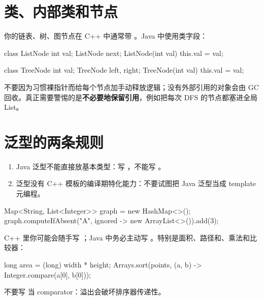 \section{类、内部类和节点}

你的链表、树、图节点在 C++ 中通常带 。Java 中使用类字段：

\begin{javacode}
class ListNode {
    int val;
    ListNode next;
    ListNode(int val) { this.val = val; }
}

class TreeNode {
    int val;
    TreeNode left, right;
    TreeNode(int val) { this.val = val; }
}
\end{javacode}

不要因为习惯裸指针而给每个节点加手动释放逻辑；没有外部引用的对象会由 GC 回收。真正需要警惕的是\textbf{不必要地保留引用}，例如把每次 DFS 的节点都塞进全局 List。

\section{泛型的两条规则}

\begin{enumerate}
  \item Java 泛型不能直接放基本类型：写 ，不能写 。
  \item 泛型没有 C++ 模板的编译期特化能力：不要试图把 Java 泛型当成 template 元编程。
\end{enumerate}

\begin{javacode}
Map<String, List<Integer>> graph = new HashMap<>();
graph.computeIfAbsent("A", ignored -> new ArrayList<>()).add(3);
\end{javacode}

\begin{pitfall}[整数溢出]
C++ 里你可能会随手写 ；Java 中务必主动写 。特别是面积、路径和、乘法和比较器：
\begin{javacode}
long area = (long) width * height;
Arrays.sort(points, (a, b) -> Integer.compare(a[0], b[0]));
\end{javacode}
不要写  当 comparator：溢出会破坏排序器传递性。
\end{pitfall}
